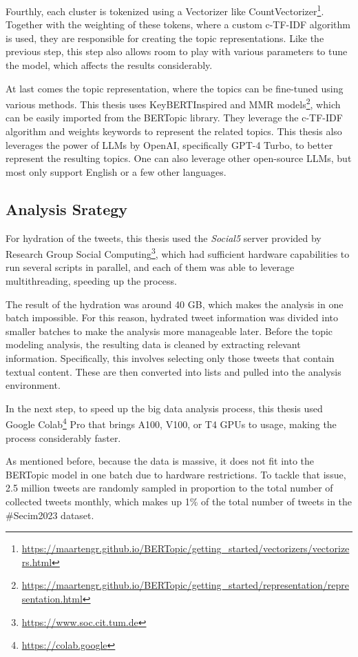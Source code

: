 Fourthly, each cluster is tokenized using a Vectorizer like 
CountVectorizer\footnote{\url{https://maartengr.github.io/BERTopic/getting_started/vectorizers/vectorizers.html}}. 
Together with the weighting of these tokens, where a custom 
\ac{c-TF-IDF} algorithm 
is used, they are responsible for creating the topic representations. 
Like the previous step, this step also allows room to play with various parameters 
to tune the model, which affects the results considerably.

At last comes the topic representation, where the topics can be fine-tuned 
using various methods. This thesis uses KeyBERTInspired and \ac{MMR} 
models\footnote{\url{https://maartengr.github.io/BERTopic/getting_started/representation/representation.html}}, 
which can be easily imported from the BERTopic library. They leverage the \ac{c-TF-IDF} algorithm 
and weights keywords to represent the related topics. 
This thesis also leverages the power of LLMs by OpenAI, specifically GPT-4 Turbo, 
to better represent the resulting topics. One can also leverage other open-source LLMs, 
but most only support English or a few other languages.

\subsection{Analysis Srategy}

For hydration of the tweets, this thesis used the \textit{Social5} server provided by Research Group Social 
Computing\footnote{\url{https://www.soc.cit.tum.de}}, which had sufficient hardware 
capabilities to run several scripts in parallel, and each of them was able to leverage 
multithreading, speeding up the process.

The result of the hydration was around 40 GB, which makes the analysis in one batch impossible. 
For this reason, hydrated tweet information was divided into smaller batches to make the 
analysis more manageable later.
Before the topic modeling analysis, the resulting data is cleaned by extracting relevant 
information. Specifically, this involves selecting only those tweets that contain textual content. 
These are then converted into lists and pulled into the analysis environment.

In the next step, to speed up the big data analysis process, this thesis used Google 
Colab\footnote{\url{https://colab.google}} Pro that brings A100, V100, or T4 GPUs to usage, 
making the process considerably faster. 

As mentioned before, because the data is massive, it does not fit into the BERTopic model 
in one batch due to hardware restrictions. To tackle that issue, 2.5 million tweets are 
randomly sampled in proportion to the total number of collected tweets monthly, which 
makes up 1\% of the total number of tweets in the \#Secim2023 dataset. 

